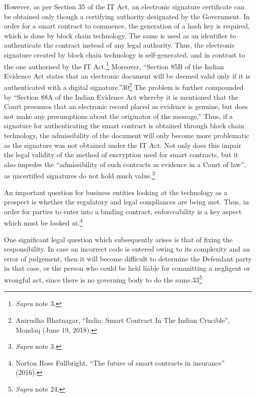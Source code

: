 \begin{multicols}{2}
\noi
However, as per Section 35 of the IT Act, an electronic signature certificate can be obtained
only though a certifying authority designated by the Government. In order for a smart
contract to commence, the generation of a hash key is required, which is done by block chain
technology. The same is used as an identifier to authenticate the contract instead of any legal
authority. Thus, the electronic signature created by block chain technology is self-generated,
and in contrast to the one authorised by the IT Act.\footnote{\textit{Supra} note 3.} Moreover, “Section 85B of the Indian
Evidence Act states that an electronic document will be deemed valid only if it is
authenticated with a digital signature.”30\footnote{Anirudha Bhatnagar, “India: Smart Contract In The Indian Crucible”, Mondaq (June 19, 2018). } The problem is further compounded by “Section 88A
of the Indian Evidence Act whereby it is mentioned that the Court presumes that an electronic
record placed as evidence is genuine, but does not make any presumptions about the
originator of the message.” Thus, if a signature for authenticating the smart contract is
obtained through block chain technology, the admissibility of the document will only become
more problematic as the signature was not obtained under the IT Act. Not only does this
impair the legal validity of the method of encryption used for smart contracts, but it also
impedes the “admissibility of such contracts as evidence in a Court of law”, as uncertified
signatures do not hold much value.\footnote{\textit{Supra} note 3.}


\noi
An important question for business entities looking at the technology as a prospect is whether
the regulatory and legal compliances are being met. Thus, in order for parties to enter into a
binding contract, enforceability is a key aspect which must be looked at.\footnote{Norton Rose Fullbright, “The future of smart contracts in insurance” (2016).}

\noi
One significant legal question which subsequently arises is that of fixing the responsibility. In
case an incorrect code is entered owing to its complexity and an error of judgement, then it
will become difficult to determine the Defendant party in that case, or the person who could
be held liable for committing a negligent or wrongful act, since there is no governing body to
do the same.33\footnote{\textit{Supra} note 24.}


\end{multicols}

